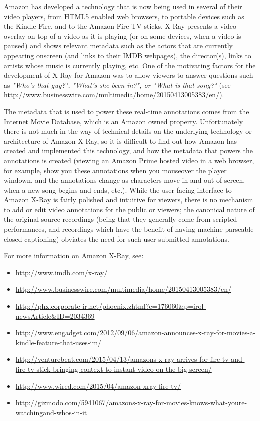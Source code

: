 Amazon has developed a technology that is now being used in several of their video players, from HTML5 enabled web browsers, to portable devices such as the Kindle Fire, and to the Amazon Fire TV sticks. X-Ray presents a video overlay on top of a video as it is playing (or on some devices, when a video is paused) and shows relevant metadata such as the actors that are currently appearing onscreen (and links to their IMDB webpages), the director(s), links to artists whose music is currently playing, etc.  One of the motivating factors for the development of X-Ray for Amazon was to allow viewers to answer questions such as \textit{"Who's that guy?", "What's she been in?", or "What is that song?"} (see \url{http://www.businesswire.com/multimedia/home/20150413005383/en/}). 

The metadata that is used to power these real-time annotations comes from the \href{http://www.imdb.com/x-ray/}{Internet Movie Database}, which is an Amazon owned property.  Unfortunately there is not much in the way of technical details on the underlying technology or architecture of Amazon X-Ray, so it is difficult to find out how Amazon has created and implemented this technology, and how the metadata that powers the annotations is created (viewing an Amazon Prime hosted video in a web browser, for example, show you these annotations when you mouseover the player windown, and the annotations change as characters move in and out of screen, when a new song begins and ends, etc.).  While the user-facing interface to Amazon X-Ray is fairly polished and intuitive for viewers, there is no mechanism to add or edit video annotations for the public or viewers; the canonical nature of the original source recordings (being that they generally come from scripted performances, and recordings which have the benefit of having machine-parseable closed-captioning) obviates the need for such user-submitted annotations.

For more information on Amazon X-Ray, see:
\begin{itemize}[noitemsep,leftmargin=*]
\item \url{http://www.imdb.com/x-ray/}
\item \url{http://www.businesswire.com/multimedia/home/20150413005383/en/}
\item \url{http://phx.corporate-ir.net/phoenix.zhtml?c=176060&p=irol-newsArticle&ID=2034369}
\item \url{http://www.engadget.com/2012/09/06/amazon-announces-x-ray-for-movies-a-kindle-feature-that-uses-im/}
\item \url{http://venturebeat.com/2015/04/13/amazons-x-ray-arrives-for-fire-tv-and-fire-tv-stick-bringing-context-to-instant-video-on-the-big-screen/}
\item \url{http://www.wired.com/2015/04/amazon-xray-fire-tv/}
\item \url{http://gizmodo.com/5941067/amazons-x-ray-for-movies-knows-what-youre-watchingand-whos-in-it}
\end{itemize}


